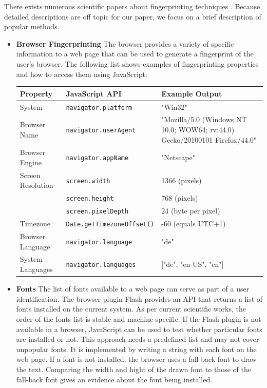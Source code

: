 			There exists numerous scientific papers about fingerprinting techniques \cite{paulstone_historysniffing, MBYS11, Nikiforakis:2013:CME:2497621.2498133, Eckersley:2010:UYW:1881151.1881152, MS12, olejnik:hal-00747841}. Because detailed descriptions are off topic for our paper, we focus on a brief description of popular methods. %
			
			\begin{itemize}
				\item \textbf{Browser Fingerprinting} The browser provides a variety of specific information to a web page that can be used to generate a fingerprint of the user's browser. The following list shows examples of fingerprinting properties and how to access them using JavaScript. 
				
				\begin{tabular}{|l|l|p{}|}
					\hline
					\textbf{Property} & \textbf{JavaScript API} & \textbf{Example Output} \\
					\hline
					System & \texttt{navigator.platform} & "Win32" \\ \hline
					Browser Name & \texttt{navigator.userAgent} & "Mozilla/5.0 (Windows NT 10.0; WOW64; rv:44.0) Gecko/20100101 Firefox/44.0" \\ \hline
					Browser Engine & \texttt{navigator.appName} & "Netscape" \\ \hline
					Screen Resolution & \texttt{screen.width} & 1366 (pixels) \\
					& \texttt{screen.height} & 768 (pixels) \\
					& \texttt{screen.pixelDepth} & 24 (byte per pixel) \\ \hline
					Timezone & \texttt{Date.getTimezoneOffset()} & -60 (equals UTC+1) \\ \hline
					Browser Language & \texttt{navigator.language} & "de" \\ \hline
					System Languages & \texttt{navigator.languages} & ["de", "en-US", "en"] \\ \hline
				\end{tabular}
				
				\item \textbf{Fonts} The list of fonts available to a web page can serve as part of a user identification. The browser plugin Flash provides an API that returns a list of fonts installed on the current system. As per current scientific works, the order of the fonts list is stable and machine-specific. %
				If the Flash plugin is not available in a browser, JavaScript can be used to test whether particular fonts are installed or not. This approach needs a predefined list and may not cover unpopular fonts. It is implemented by writing a string with each font on the web page. If a font is not installed, the browser uses a fall-back font to draw the text. Comparing the width and hight of the drawn font to those of the fall-back font gives an evidence about the font being installed. 
				

\end{itemize}
